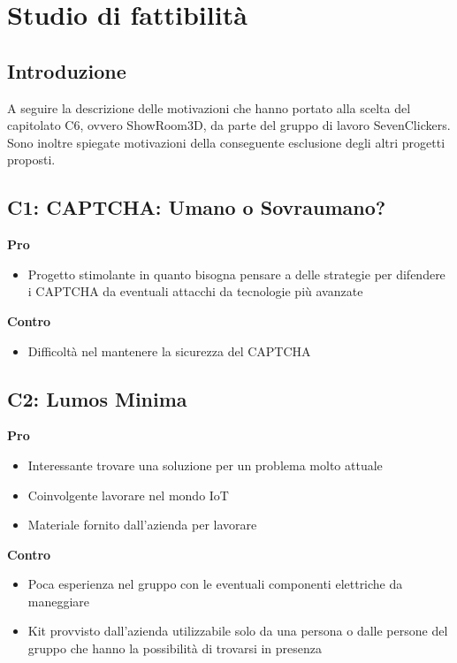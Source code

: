 \newcommand\myfontsize{\fontsize{13pt}{18pt}\selectfont}
\section{Studio di fattibilità}
\subsection{Introduzione}
A seguire la descrizione delle motivazioni che hanno portato alla scelta del capitolato C6, 
ovvero ShowRoom3D, da parte del gruppo di lavoro SevenClickers.
Sono inoltre spiegate motivazioni della conseguente esclusione degli altri progetti proposti.

\subsection{C1: CAPTCHA: Umano o Sovraumano?}

\textbf{Pro}
\begin{itemize}[leftmargin=30pt, rightmargin=2cm]
  \item Progetto stimolante in quanto bisogna pensare a delle strategie per difendere i CAPTCHA da eventuali attacchi da tecnologie più avanzate
\end{itemize}
\textbf{Contro}
\begin{itemize}
    \item Difficoltà nel mantenere la sicurezza del CAPTCHA
\end{itemize}

\subsection{C2: Lumos Minima}
\textbf{Pro}
\begin{itemize}[leftmargin=30pt, rightmargin=2cm]
    \item Interessante trovare una soluzione per un problema molto attuale
    \item Coinvolgente lavorare nel mondo IoT
    \item  Materiale fornito dall’azienda per lavorare
\end{itemize}
\textbf{Contro}
\begin{itemize}
    \item Poca esperienza nel gruppo con le eventuali componenti elettriche da maneggiare
    \item Kit provvisto dall’azienda utilizzabile solo da una persona o dalle persone del gruppo che hanno la possibilità di trovarsi in presenza
\end{itemize}

